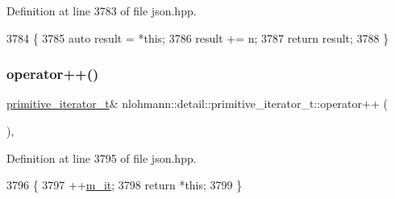 Definition at line 3783 of file json.\+hpp.


\begin{DoxyCode}
3784     \{
3785         \textcolor{keyword}{auto} result = *\textcolor{keyword}{this};
3786         result += n;
3787         \textcolor{keywordflow}{return} result;
3788     \}
\end{DoxyCode}
\mbox{\label{classnlohmann_1_1detail_1_1primitive__iterator__t_ad26511012fc88f3ec5d9e1cb708732fd}} 
\subsubsection{\texorpdfstring{operator++()}{operator++()}\hspace{0.1cm}{\footnotesize\ttfamily [1/2]}}
{\footnotesize\ttfamily \hyperlink{classnlohmann_1_1detail_1_1primitive__iterator__t}{primitive\+\_\+iterator\+\_\+t}\& nlohmann\+::detail\+::primitive\+\_\+iterator\+\_\+t\+::operator++ (\begin{DoxyParamCaption}{ }\end{DoxyParamCaption})\hspace{0.3cm}{\ttfamily [inline]}, {\ttfamily [noexcept]}}



Definition at line 3795 of file json.\+hpp.


\begin{DoxyCode}
3796     \{
3797         ++\hyperlink{classnlohmann_1_1detail_1_1primitive__iterator__t_a4357355113b0cd7e12b15c2e93703510}{m\_it};
3798         \textcolor{keywordflow}{return} *\textcolor{keyword}{this};
3799     \}
\end{DoxyCode}
\mbox{\label{classnlohmann_1_1detail_1_1primitive__iterator__t_aa011863621357b3cf891670bf63a48b1}} 
